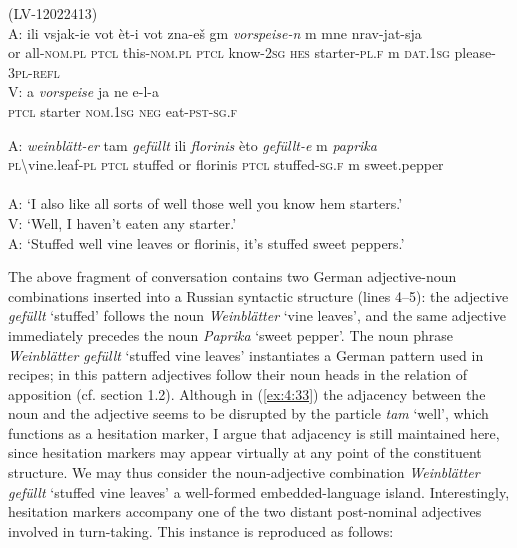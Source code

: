 \ea
\label{ex:4:33}
(LV-12022413)\\
 \gll A: ili vsjak-ie vot èt-i vot zna-eš gm  \textit{vorspeise-n} {{\textcolor[rgb]{1,1,1} {m}} mne} nrav-jat-sja\\
	{} or all-\textsc{nom.pl} \textsc{ptcl} this-\textsc{nom.pl} \textsc{ptcl} know-\textsc{2sg} \textsc{hes} starter-\textsc{pl.f}  {{\textcolor[rgb]{1,1,1} {m}} \textsc{dat.1sg}} please-\textsc{3pl-refl}\\
\glt
 \gll V: a \textit{vorspeise}  ja ne e-l-a \\
	{} \textsc{ptcl} starter \textsc{nom.1sg} \textsc{neg} eat-\textsc{pst-sg.f} \\
	\glt
	
 \gll A: \textit{weinblätt-er}  tam \textit{gefüllt}  ili \textit{florinis} èto \textit{gefüllt-e} {{\textcolor[rgb]{1,1,1} {m}} \textit{paprika}} \\
	{}  \textsc{pl}\textbackslash{}vine.leaf-\textsc{pl} \textsc{ptcl} stuffed or florinis \textsc{ptcl} stuffed-\textsc{sg.f}  {{\textcolor[rgb]{1,1,1} {m}} sweet.pepper}\\
\glt \hfill \\

A: `I also like all sorts of well those well you know hem starters.'\\
V: `Well, I haven't eaten any starter.'\\
A: `Stuffed well vine leaves or florinis, it's stuffed sweet peppers.'
\z

\noindent The above fragment of conversation contains two German adjective-noun combinations inserted into a Russian syntactic structure (lines 4--5): the adjective \textit{gefüllt} `stuffed' follows the noun \textit{Weinblätter} `vine leaves', and the same adjective immediately precedes the noun \textit{Paprika} `sweet pepper'. The noun phrase \textit{Weinblätter gefüllt} `stuffed vine leaves' instantiates a German pattern used in recipes; in this pattern adjectives follow their noun heads in the relation of apposition (cf. section 1.2). Although in (\ref{ex:4:33}) the adjacency between the noun and the adjective seems to be disrupted by the particle \textit{tam} `well', which functions as a hesitation marker, I argue that adjacency is still maintained here, since hesitation markers may appear virtually at any point of the constituent structure. We may thus consider the noun-adjective combination \textit{Weinblätter gefüllt} `stuffed vine leaves' a well-formed embedded-language island. Interestingly, hesitation markers accompany one of the two distant post-nominal adjectives involved in turn-taking. This instance is reproduced as follows:

